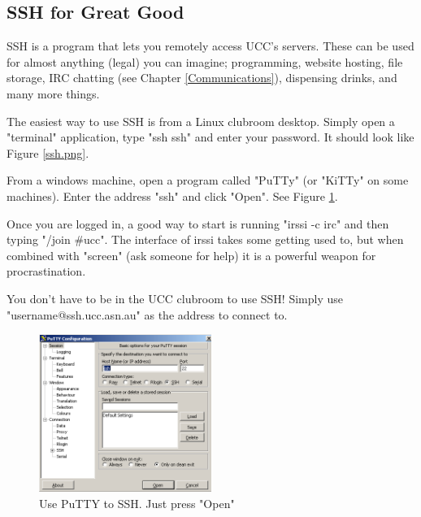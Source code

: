 \begin{mdframed}

\section{SSH for Great Good}

SSH is a program that lets you remotely access UCC's servers. These can be used for almost anything (legal) you can imagine; programming, website hosting, file storage, IRC chatting (see Chapter \ref{Communications}), dispensing drinks, and many more things.

The easiest way to use SSH is from a Linux clubroom desktop. Simply open a "terminal" application, type "ssh ssh" and enter your password. It should look like Figure \ref{ssh.png}.

From a windows machine, open a program called "PuTTy" (or "KiTTy" on some machines). Enter the address "ssh" and click "Open". See Figure \ref{putty.png}.

Once you are logged in, a good way to start is running "irssi -c irc" and then typing "/join \#ucc". The interface of irssi takes some getting used to, but when combined with "screen" (ask someone for help) it is a powerful weapon for procrastination.

You don't have to be in the UCC clubroom to use SSH! Simply use "username@ssh.ucc.asn.au" as the address to connect to.

\end{mdframed}

\begin{mdframed}



\begin{figure}[H]
	\centering
	\includegraphics[width=0.5\textwidth]{figures/putty.png}
	\caption{Use PuTTY to SSH. Just press "Open"} 
	\label{putty.png}
\end{figure}

\end{mdframed}
